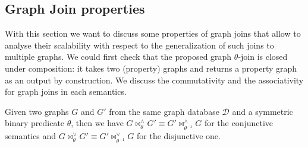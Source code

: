 \subsection{Graph Join properties}
With this section we want to discuss some properties of graph joins that allow to analyse their scalability with respect to the generalization of such joins to multiple graphs.
We could first check that the proposed graph $\theta$-join is closed under composition:
it takes two (property) graphs and returns a property graph as an output by construction.
We discuss the commutativity and the associativity for graph joins in each semantics.
\begin{lemma}
	Given two graphs $G$ and $G'$ from the same graph database $\mathcal{D}$ and a symmetric binary predicate
	$\theta$, then we have $G\bowtie_\theta^\wedge G' \equiv G'\bowtie_{\theta^{-1}}^\wedge G$ for the conjunctive
	semantics and $G\bowtie_\theta^\vee G' \equiv G'\bowtie_{\theta^{-1}}^\vee G$ for the disjunctive one.
\end{lemma}
